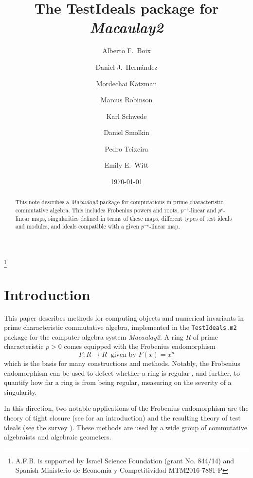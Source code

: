 \documentclass[11pt]{amsart}
\begin{document}
\title{The  {TestIdeals} package for \emph{Macaulay2}}
\author{Alberto F.\ Boix}
\address{Department of Mathematics, Ben-Gurion University of the Negev, P.O.B. 653 Beer-Sheva 8410501, ISRAEL.}
\thanks{A.F.B. is supported by Israel Science Foundation (grant No. 844/14) and Spanish Ministerio de Econom\'ia y Competitividad MTM2016-7881-P}
\author{Daniel J.\ Hern\'andez}
\author{Mordechai Katzman}
\author{Marcus Robinson}
\author{Karl Schwede}
\author{Daniel Smolkin}
\author{Pedro Teixeira}
\author{Emily E.\ Witt}
\date{\today}
\address{Department of Mathematics, University of Utah, 155 S 1400 E Room 233, Salt Lake City, UT, 84112}

\begin{abstract}
	This note describes a \emph{Macaulay2} package for computations in prime characteristic commutative algebra.  This includes Frobenius powers and roots, $p^{-e}$-linear and $p^{e}$-linear  maps,
  singularities defined in terms of these maps, different types of test ideals and modules, and ideals compatible with a given $p^{-e}$-linear map.
\end{abstract}




\maketitle

\section{Introduction}

This paper describes methods for computing objects and numerical invariants in prime characteristic commutative algebra, implemented in the \texttt{TestIdeals.m2} package for the computer algebra system \emph{Macaulay2}.
A ring $R$ of prime characteristic $p>0$ comes equipped with the Frobenius endomorphism
\[ F: R \to R \ \text{ given by } F(x) =  x^p \]
which is the basis for many constructions and methods.
Notably, the Frobenius endomorphism can be used to detect whether a ring is regular \cite{KunzCharacterizationsOfRegularLocalRings}, and further, to quantify how far a ring is from being regular, measuring on the severity of a singularity.

In this direction, two notable applications of the Frobenius endomorphism are the theory of tight closure
(see \cite{HochsterHunekeTC1,HochsterFoundations} for an introduction)
and the resulting theory of test ideals
(see the survey \cite{SchwedeTuckerTestIdealSurvey}).  These methods are used by a wide group of commutative algebraists and algebraic geometers.
\end{document}
